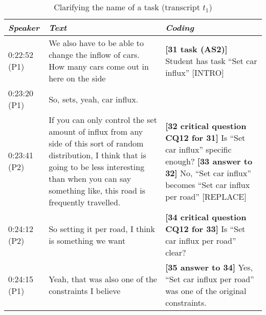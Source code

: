 \begin{table}[!htbp]
\begin{tabular}{|p{17mm}|p{63mm}|p{70mm}|}
\hline
\textit{Speaker} & \textit{Text} & \textit{Coding}\\
\hline
0:22:52 (P1) & We also have to be able to change the inflow of cars. How many cars come out in here on the side & \textbf{[31 task (AS2)]} Student has task ``Set car influx'' \textsf{[INTRO]}\\
\cline{1-2}
0:23:20 (P1)	& So, sets, yeah, car influx. & \\
\hline
0:23:41 (P2) &	If you can only control the set amount of influx from any side of this sort of random distribution, I think that is going to be less interesting than when you can say something like, this road is frequently travelled. 	& \textbf{[32 critical question CQ12 for 31]} Is ``Set car influx'' specific enough? \newline \textbf{[33 answer to 32]} No, ``Set car influx'' becomes ``Set car influx per road'' \textsf{[REPLACE]}\\
\hline
0:24:12 (P2)	& So setting it per road, I think is something we want	& \textbf{[34 critical question CQ12 for 33]} Is ``Set car influx per road'' clear? \\
\hline
0:24:15 (P1)	& Yeah, that was also one of the constraints I believe &  \textbf{[35 answer to 34]} Yes, ``Set car influx per road'' was one of the original constraints.\\
\hline
\end{tabular}
\caption{Clarifying the name of a task (transcript $t_1$)}
\label{table:transcript:task-clarification}


\end{table}
